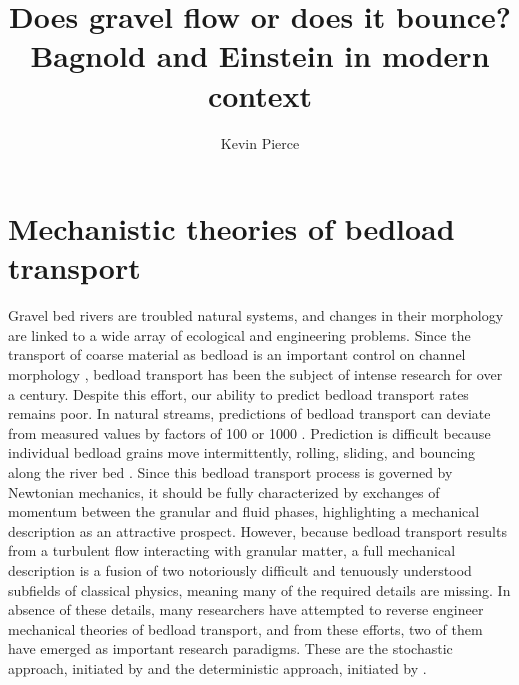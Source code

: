 \documentclass{article}
\begin{document}
\title{Does gravel flow or does it bounce?\\ Bagnold and Einstein in modern context}
\author{Kevin Pierce}
\maketitle

\begin{abstract}
\end{abstract}
\section{Mechanistic theories of bedload transport}

Gravel bed rivers are troubled natural systems, and changes in their morphology are linked to a wide array of ecological and engineering problems.
Since the transport of coarse material as bedload is an important control on channel morphology \citep{Church2006, Recking2016}, bedload transport has been the subject of intense research for over a century. 
Despite this effort, our ability to predict bedload transport rates remains poor.  
In natural streams, predictions of bedload transport can deviate from measured values by factors of 100 or 1000 \citep{Gomez1989, Barry2004, Recking2012}. 
Prediction is difficult because individual bedload grains move intermittently, rolling, sliding, and bouncing along the river bed \citep{Einstein1950, Bagnold1973}. 
Since this bedload transport process is governed by Newtonian mechanics, it should be fully characterized by exchanges of momentum between the granular and fluid phases, highlighting a mechanical description as an attractive prospect.
However, because bedload transport results from a turbulent flow interacting with granular matter, a full mechanical description is a fusion of two notoriously difficult and tenuously understood subfields of classical physics, meaning many of the required details are missing.
In absence of these details, many researchers have attempted to reverse engineer mechanical theories of bedload transport, and from these efforts, two of them have emerged as important research paradigms. 
These are the stochastic approach, initiated by \citet{Einstein1937, Einstein1950, Einstein1964} and the deterministic approach, initiated by \citet{Bagnold1956, Bagnold1966, Bagnold1973}. 
\end{document}
